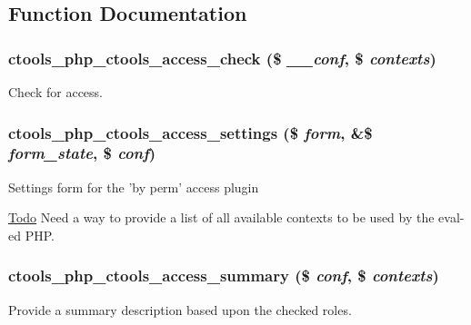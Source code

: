 \subsection{Function Documentation}
\hypertarget{php_8inc_a7acb817afdb0c9ef7b1c6fa6cc71674f}{
\subsubsection[{ctools\_\-php\_\-ctools\_\-access\_\-check}]{\setlength{\rightskip}{0pt plus 5cm}ctools\_\-php\_\-ctools\_\-access\_\-check (\$ {\em \_\-\_\-conf}, \/  \$ {\em contexts})}}
\label{php_8inc_a7acb817afdb0c9ef7b1c6fa6cc71674f}
Check for access. \hypertarget{php_8inc_ad173cf9e9891ef70924fad63a89396fa}{
\subsubsection[{ctools\_\-php\_\-ctools\_\-access\_\-settings}]{\setlength{\rightskip}{0pt plus 5cm}ctools\_\-php\_\-ctools\_\-access\_\-settings (\$ {\em form}, \/  \&\$ {\em form\_\-state}, \/  \$ {\em conf})}}
\label{php_8inc_ad173cf9e9891ef70924fad63a89396fa}
Settings form for the 'by perm' access plugin

\begin{Desc}
\item[\hyperlink{todo__todo000015}{Todo}]Need a way to provide a list of all available contexts to be used by the eval-\/ed PHP. \end{Desc}
\hypertarget{php_8inc_ad017dbac9fb627e7fb7cb9ac4cd95147}{
\subsubsection[{ctools\_\-php\_\-ctools\_\-access\_\-summary}]{\setlength{\rightskip}{0pt plus 5cm}ctools\_\-php\_\-ctools\_\-access\_\-summary (\$ {\em conf}, \/  \$ {\em contexts})}}
\label{php_8inc_ad017dbac9fb627e7fb7cb9ac4cd95147}
Provide a summary description based upon the checked roles. 

